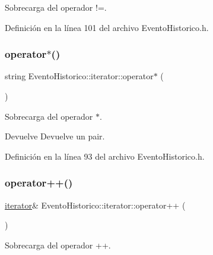 Sobrecarga del operador !=. 



Definición en la línea 101 del archivo Evento\+Historico.\+h.

\hypertarget{classEventoHistorico_1_1iterator_a0423c1e5d9bebd288442940bef5ed762}{}\label{classEventoHistorico_1_1iterator_a0423c1e5d9bebd288442940bef5ed762} 
\subsubsection{\texorpdfstring{operator$\ast$()}{operator*()}}
{\footnotesize\ttfamily string Evento\+Historico\+::iterator\+::operator$\ast$ (\begin{DoxyParamCaption}{ }\end{DoxyParamCaption})\hspace{0.3cm}{\ttfamily [inline]}}



Sobrecarga del operador $\ast$. 

\begin{DoxyReturn}{Devuelve}
Devuelve un pair. 
\end{DoxyReturn}


Definición en la línea 93 del archivo Evento\+Historico.\+h.

\hypertarget{classEventoHistorico_1_1iterator_afd7e698045c436ee93d1e357b6829b00}{}\label{classEventoHistorico_1_1iterator_afd7e698045c436ee93d1e357b6829b00} 
\subsubsection{\texorpdfstring{operator++()}{operator++()}}
{\footnotesize\ttfamily \hyperlink{classEventoHistorico_1_1iterator}{iterator}\& Evento\+Historico\+::iterator\+::operator++ (\begin{DoxyParamCaption}{ }\end{DoxyParamCaption})\hspace{0.3cm}{\ttfamily [inline]}}



Sobrecarga del operador ++. 



